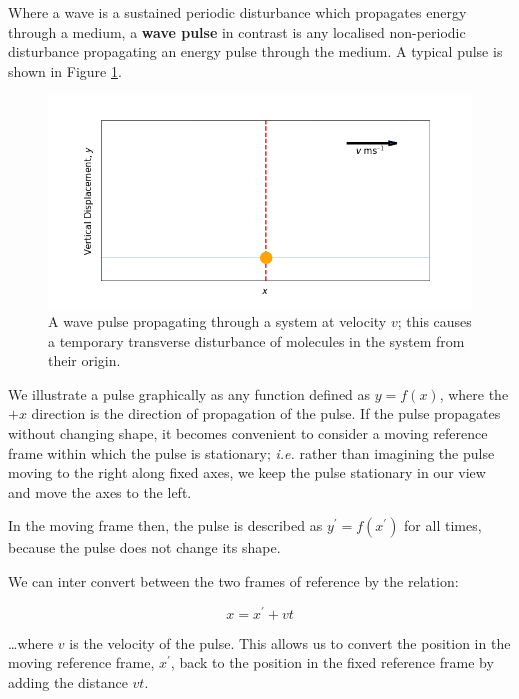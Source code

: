 \documentclass[
]{book}
\begin{document}
Where a wave is a sustained periodic disturbance which propagates energy through a medium, a \textbf{wave pulse} in contrast is any localised non-periodic disturbance propagating an energy pulse through the medium. A typical pulse is shown in Figure \ref{fig:ch6-wavepulse1}.

\begin{figure}

{\centering \includegraphics[width=0.7\linewidth]{visualisations/ch6-wavepulse1} 

}

\caption{A wave pulse propagating through a system at velocity $v$; this causes a temporary transverse disturbance of molecules in the system from their origin.}\label{fig:ch6-wavepulse1}
\end{figure}

We illustrate a pulse graphically as any function defined as \(y = f(x)\), where the \(+x\) direction is the direction of propagation of the pulse. If the pulse propagates without changing shape, it becomes convenient to consider a moving reference frame within which the pulse is stationary; \emph{i.e.} rather than imagining the pulse moving to the right along fixed axes, we keep the pulse stationary in our view and move the axes to the left.

In the moving frame then, the pulse is described as \(y^\prime = f(x^\prime)\) for all times, because the pulse does not change its shape.

We can inter convert between the two frames of reference by the relation:

\begin{equation}
x = x^\prime + vt
\label{eq:ch6-refframeconvert1}
\end{equation}

\ldots where \(v\) is the velocity of the pulse. This allows us to convert the position in the moving reference frame, \(x^\prime\), back to the position in the fixed reference frame by adding the distance \(vt\).
\end{document}
